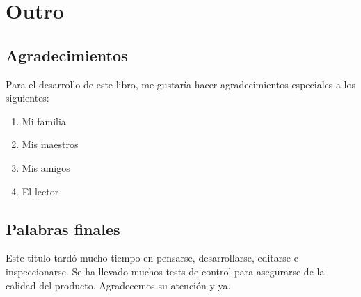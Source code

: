 \section{Outro} 
\subsection{Agradecimientos}
Para el desarrollo de este libro, me gustaría hacer agradecimientos especiales
a los siguientes:
\begin{enumerate}
\item Mi familia
\item Mis maestros
\item Mis amigos
\item El lector
\end {enumerate}

\subsection{Palabras finales}
Este titulo tardó mucho tiempo en pensarse, desarrollarse, editarse e
inspeccionarse. Se ha llevado muchos tests de control para asegurarse de la
calidad del producto. Agradecemos su atención y ya.
